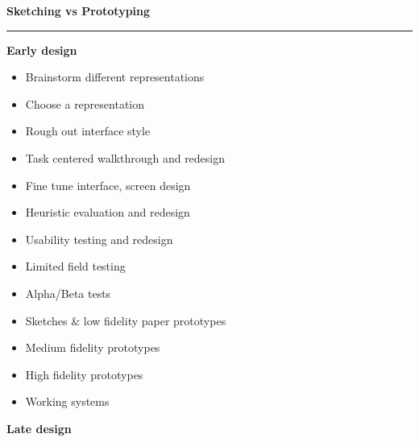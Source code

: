 \documentclass[pdf]{beamer}
\begin{document}
\begin{frame}
\vspace{8mm}
\textcolor{myBlue}{\textbf{\Large{Sketching vs Prototyping}}}

\textcolor{red}{\rule{10cm}{1mm}}

\begin{center}
\textbf{Early design}
\end{center}

\begin{scriptsize}

\begin{minipage}[b]{0.49\textwidth}
\begin{itemize}
\item Brainstorm different representations
\item Choose a representation
\item Rough out interface style
\newline
\item Task centered walkthrough and redesign
\newline
\item Fine tune interface, screen design
\item Heuristic evaluation and redesign
\item Usability testing and redesign
\newline
\item Limited field testing
\newline
\item Alpha/Beta tests
\end{itemize}
\end{minipage}
\begin{minipage}[b]{0.49\textwidth}
\begin{itemize}
\item Sketches \& low fidelity paper prototypes
\newline
\newline
\newline
\newline
\item Medium fidelity prototypes
\newline
\newline
\newline
\newline
\item High fidelity prototypes
\newline
\item Working systems
\end{itemize}
\end{minipage}

\end{scriptsize}

\begin{center}
\textbf{Late design}
\end{center}

\end{frame}
\end{document}
